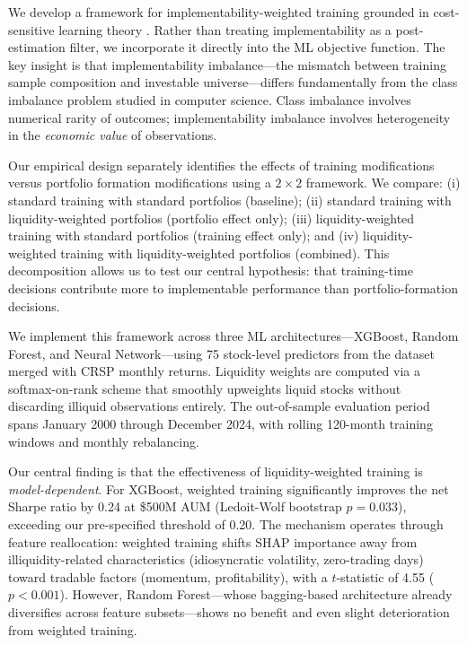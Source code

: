 \documentclass[a4paper,12pt,final]{article}
\begin{document}
We develop a framework for implementability-weighted training grounded in cost-sensitive learning theory \citep{elkan2001foundations}. Rather than treating implementability as a post-estimation filter, we incorporate it directly into the ML objective function. The key insight is that implementability imbalance---the mismatch between training sample composition and investable universe---differs fundamentally from the class imbalance problem studied in computer science. Class imbalance involves numerical rarity of outcomes; implementability imbalance involves heterogeneity in the \emph{economic value} of observations.

Our empirical design separately identifies the effects of training modifications versus portfolio formation modifications using a $2\times 2$ framework. We compare: (i) standard training with standard portfolios (baseline); (ii) standard training with liquidity-weighted portfolios (portfolio effect only); (iii) liquidity-weighted training with standard portfolios (training effect only); and (iv) liquidity-weighted training with liquidity-weighted portfolios (combined). This decomposition allows us to test our central hypothesis: that training-time decisions contribute more to implementable performance than portfolio-formation decisions.

We implement this framework across three ML architectures---XGBoost, Random Forest, and Neural Network---using 75 stock-level predictors from the \citet{chen2022open} dataset merged with CRSP monthly returns. Liquidity weights are computed via a softmax-on-rank scheme that smoothly upweights liquid stocks without discarding illiquid observations entirely. The out-of-sample evaluation period spans January 2000 through December 2024, with rolling 120-month training windows and monthly rebalancing.

Our central finding is that the effectiveness of liquidity-weighted training is \emph{model-dependent}. For XGBoost, weighted training significantly improves the net Sharpe ratio by 0.24 at \$500M AUM (Ledoit-Wolf bootstrap $p=0.033$), exceeding our pre-specified threshold of 0.20. The mechanism operates through feature reallocation: weighted training shifts SHAP importance away from illiquidity-related characteristics (idiosyncratic volatility, zero-trading days) toward tradable factors (momentum, profitability), with a $t$-statistic of 4.55 ($p<0.001$). However, Random Forest---whose bagging-based architecture already diversifies across feature subsets---shows no benefit and even slight deterioration from weighted training.
\end{document}
